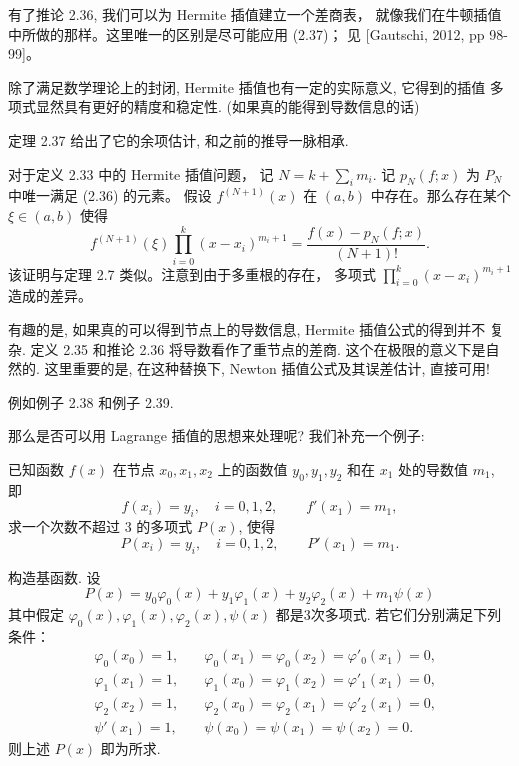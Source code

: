 \documentclass[a4paper]{ctexart}
\begin{document}
 有了推论 2.36, 我们可以为 Hermite 插值建立一个差商表，
就像我们在牛顿插值中所做的那样。这里唯一的区别是尽可能应用 (2.37)；
见 [Gautschi, 2012, pp 98-99]。

除了满足数学理论上的封闭, Hermite 插值也有一定的实际意义, 它得到的插值
多项式显然具有更好的精度和稳定性. (如果真的能得到导数信息的话)

定理 2.37 给出了它的余项估计, 和之前的推导一脉相承.

 对于定义 2.33 中的 Hermite 插值问题，
记 $N = k + \sum_i m_i$. 记 $p_N(f ; x)$ 为 $P_N$ 中唯一满足 (2.36) 的元素。
假设 $f^{(N+1)}(x)$ 在 $(a, b)$ 中存在。那么存在某个 $\xi \in (a, b)$ 使得
\[
f^{(N+1)}(\xi) \prod_{i=0}^{k} (x - x_i)^{m_i + 1} 
= \frac{f(x) - p_N(f ; x)}{(N + 1)!}. \tag{2.38}
\]
 该证明与定理 2.7 类似。注意到由于多重根的存在，
多项式 $\prod_{i=0}^{k} (x - x_i)^{m_i + 1}$ 造成的差异。

有趣的是, 如果真的可以得到节点上的导数信息, Hermite 插值公式的得到并不
复杂. 定义 2.35 和推论 2.36 将导数看作了重节点的差商. 这个在极限的意义下是自然的. 
这里重要的是, 在这种替换下, Newton 插值公式及其误差估计, 直接可用!

例如例子 2.38 和例子 2.39.

那么是否可以用 Lagrange 插值的思想来处理呢? 我们补充一个例子:

已知函数 $f(x)$ 在节点 $x_0, x_1, x_2$ 上的函数值 $y_0, y_1, y_2$ 和在 $x_1$ 处的导数值
$m_1$, 即                                                                           
$$
f(x_i) = y_i,\quad i = 0, 1, 2, \qquad f'(x_1) = m_1,
$$                                 
求一个次数不超过 $3$ 的多项式 $P(x)$, 使得                                            
$$
P(x_i) = y_i,\quad i = 0, 1, 2, \qquad P'(x_1) = m_1.
$$  

构造基函数. 设                                                                   
$$
P(x) = y_0 \varphi_0(x) + y_1 \varphi_1(x) + y_2 \varphi_2(x) + m_1 \psi(x)
$$                                 
其中假定 $\varphi_0(x), \varphi_1(x), \varphi_2(x), \psi(x)$ 都是3次多项式.
若它们分别满足下列条件：     
\begin{eqnarray}                                                                                    
&\varphi_0(x_0)=1, \quad &\varphi_0(x_1)=\varphi_0(x_2)=\varphi'_0(x_1)=0,\\             
&\varphi_1(x_1)=1,\quad &\varphi_1(x_0)=\varphi_1(x_2)=\varphi'_1(x_1)=0,\\             
&\varphi_2(x_2)=1,\quad &\varphi_2(x_0)=\varphi_2(x_1)=\varphi'_2(x_1)=0,\\             
&\psi'(x_1)=1,\quad &\psi(x_0)=\psi(x_1)=\psi(x_2)=0.                                   
\end{eqnarray}                                                                                      
则上述 $P(x)$ 即为所求.
\end{document}
